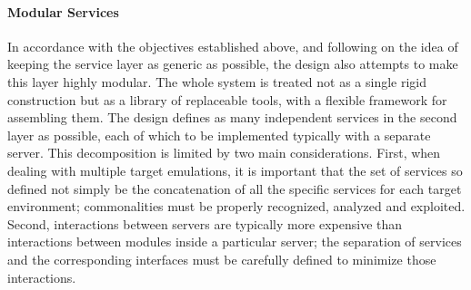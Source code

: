 \paragraph{Modular Services}
In accordance with the objectives established above, and following on
the idea of keeping the service layer as generic as possible, the
design also attempts to make this layer highly modular. The whole
system is treated not as a single rigid construction but as a library
of replaceable tools, with a flexible framework for assembling them.
The design defines as many independent services in the second layer as
possible, each of which to be implemented typically with a separate
server.  This decomposition is limited by two main considerations.
First, when dealing with multiple target emulations, it is important
that the set of services so defined not simply be the concatenation of
all the specific services for each target environment; commonalities
must be properly recognized, analyzed and exploited.  Second,
interactions between servers are typically more expensive than
interactions between modules inside a particular server; the
separation of services and the corresponding interfaces must be
carefully defined to minimize those interactions.


